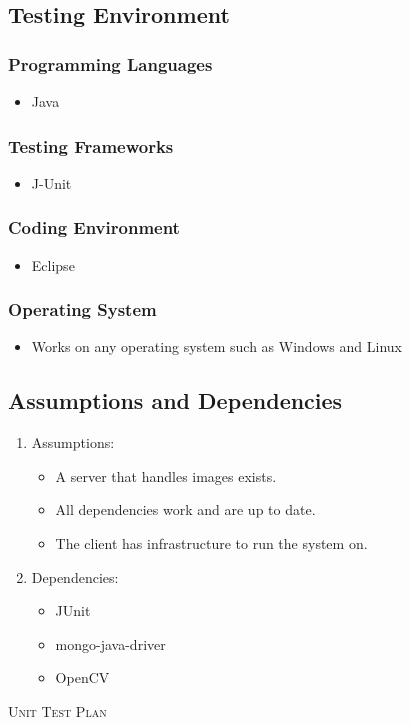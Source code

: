 \documentclass[a4paper,12pt]{report}
\begin{document}
	\subsection {Testing Environment}
		\subsubsection{Programming Languages}
			\begin {itemize}
				\item Java
			\end {itemize}
		\subsubsection{Testing Frameworks}
			\begin {itemize}
				\item J-Unit
			\end {itemize}
		\subsubsection{Coding Environment}
			\begin {itemize}
				\item Eclipse
			\end {itemize}
		\subsubsection{Operating System}
			\begin {itemize}
				\item Works on any operating system such as Windows and Linux
			\end {itemize}
	
	\newpage
	\subsection{Assumptions and Dependencies}
		\begin {enumerate}
			\item Assumptions:
			\begin {itemize}
				\item A server that handles images exists.
				\item All dependencies work and are up to date.
				\item The client has infrastructure to run the system on.
			\end {itemize}
				
			\item Dependencies:
			\begin {itemize}
				\item JUnit
				\item mongo-java-driver
				\item OpenCV
			\end {itemize}
		\end {enumerate}
\newpage
\begin{center}
	\textsc{\LARGE Unit Test Plan}\\[1.5cm]
\end{center}
\end{document}

